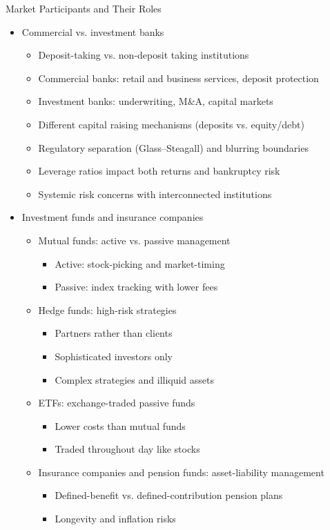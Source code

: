 \documentclass[10pt,handout]{beamer}
\begin{document}
\begin{frame}{Market Participants and Their Roles}
  \begin{itemize}[<+->]
    \item Commercial vs. investment banks
      \begin{itemize}
        \item Deposit-taking vs. non-deposit taking institutions
        \item Commercial banks: retail and business services, deposit protection
        \item Investment banks: underwriting, M\&A, capital markets
        \item Different capital raising mechanisms (deposits vs. equity/debt)
        \item Regulatory separation (Glass–Steagall) and blurring boundaries
        \item Leverage ratios impact both returns and bankruptcy risk
        \item Systemic risk concerns with interconnected institutions
      \end{itemize}
    \item Investment funds and insurance companies
      \begin{itemize}
        \item Mutual funds: active vs. passive management
          \begin{itemize}
            \item Active: stock-picking and market-timing
            \item Passive: index tracking with lower fees
          \end{itemize}
        \item Hedge funds: high-risk strategies
          \begin{itemize}
            \item Partners rather than clients
            \item Sophisticated investors only
            \item Complex strategies and illiquid assets
          \end{itemize}
        \item ETFs: exchange-traded passive funds
          \begin{itemize}
            \item Lower costs than mutual funds
            \item Traded throughout day like stocks
          \end{itemize}
        \item Insurance companies and pension funds: asset-liability management
          \begin{itemize}
            \item Defined-benefit vs. defined-contribution pension plans
            \item Longevity and inflation risks
          \end{itemize}
      \end{itemize}
  \end{itemize}
\end{frame}
\end{document}
